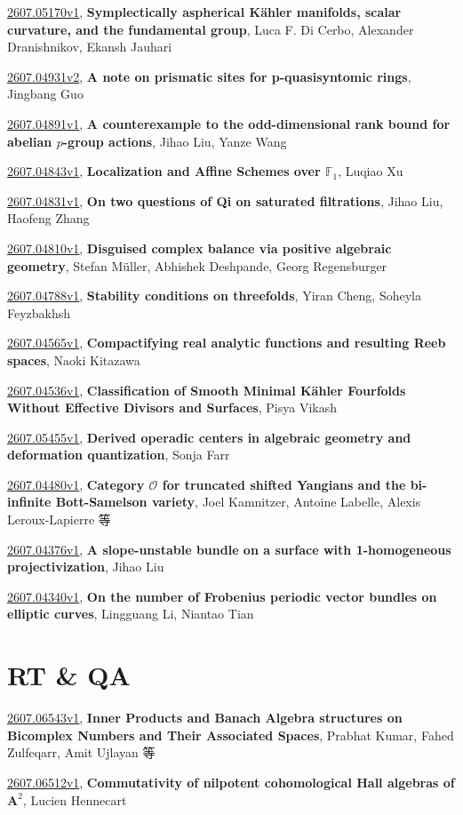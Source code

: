 \documentclass[9pt, a4paper]{article}
\theoremstyle{plain}
\theoremstyle{definition}
\theoremstyle{remark}
\newcommand{\arxiv}[3]{\href{https://arxiv.org/abs/#1}{#1}, \textbf{\textcolor{arxivblue}{#2}}, #3}
\begin{document}
\arxiv{2607.05170v1}{Symplectically aspherical Kähler manifolds, scalar curvature, and the fundamental group}{Luca F. Di Cerbo, Alexander Dranishnikov, Ekansh Jauhari}

\arxiv{2607.04931v2}{A note on prismatic sites for p-quasisyntomic rings}{Jingbang Guo}

\arxiv{2607.04891v1}{A counterexample to the odd-dimensional rank bound for abelian \texorpdfstring{$p$}{p}-group actions}{Jihao Liu, Yanze Wang}

\arxiv{2607.04843v1}{Localization and Affine Schemes over $\mathbb{F}_1$}{Luqiao Xu}

\arxiv{2607.04831v1}{On two questions of Qi on saturated filtrations}{Jihao Liu, Haofeng Zhang}

\arxiv{2607.04810v1}{Disguised complex balance via positive algebraic geometry}{Stefan Müller, Abhishek Deshpande, Georg Regensburger}

\arxiv{2607.04788v1}{Stability conditions on threefolds}{Yiran Cheng, Soheyla Feyzbakhsh}

\arxiv{2607.04565v1}{Compactifying real analytic functions and resulting Reeb spaces}{Naoki Kitazawa}

\arxiv{2607.04536v1}{Classification of Smooth Minimal Kähler Fourfolds Without Effective Divisors and Surfaces}{Pisya Vikash}

\arxiv{2607.05455v1}{Derived operadic centers in algebraic geometry and deformation quantization}{Sonja Farr}

\arxiv{2607.04480v1}{Category $\mathcal{O}$ for truncated shifted Yangians and the bi-infinite Bott-Samelson variety}{Joel Kamnitzer, Antoine Labelle, Alexis Leroux-Lapierre 等}

\arxiv{2607.04376v1}{A slope-unstable bundle on a surface with 1-homogeneous projectivization}{Jihao Liu}

\arxiv{2607.04340v1}{On the number of Frobenius periodic vector bundles on elliptic curves}{Lingguang Li, Niantao Tian}


\section{RT \& QA}
\arxiv{2607.06543v1}{Inner Products and Banach Algebra structures on Bicomplex Numbers and Their Associated Spaces}{Prabhat Kumar, Fahed Zulfeqarr, Amit Ujlayan 等}

\arxiv{2607.06512v1}{Commutativity of nilpotent cohomological Hall algebras of $\mathbf{A}^2$}{Lucien Hennecart}
\end{document}
